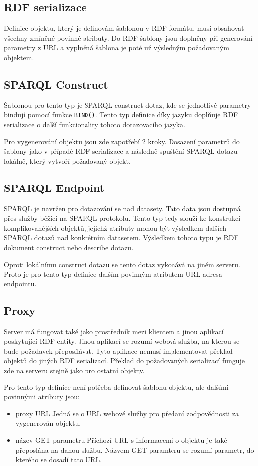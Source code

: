 \documentclass[thesis=B,czech]{FITthesis}[2012/06/26]
\begin{document}
 \subsection{RDF serializace}
   Definice objektu, který je definovám šablonou v RDF formátu, musí obsahovat všechny zmíněné povinné atributy. Do RDF šablony jsou doplněny při generování parametry z
   URL a vyplněná šablona je poté už výsledným požadovaným objektem.
 
 \subsection{SPARQL Construct}\label{sparql_construct}
  Šablonou pro tento typ je SPARQL construct dotaz, kde se jednotlivé parametry bindují pomocí funkce \texttt{BIND()}. Tento typ definice díky jazyku 
  doplňuje RDF serializace o další funkcionality tohoto dotazovacího jazyka.
  
  Pro vygenerování objektu jsou zde zapotřebí 2 kroky. Dosazení parametrů do šablony jako v případě RDF serializace a následně spuštění SPARQL dotazu lokálně, který
  vytvoří požadovaný objekt.
  
 \subsection{SPARQL Endpoint}
  SPARQL je navržen pro dotazování se nad datasety. Tato data jsou dostupná přes služby běžící na SPARQL protokolu. Tento typ tedy slouží ke konstrukci
  komplikovanějších objektů, jejichž atributy mohou být výsledkem dalších \\SPARQL dotazů nad konkrétním datasetem. Výsledkem tohoto typu je RDF dokument construct
  nebo describe dotazu.
  
  Oproti lokálnímu construct dotazu se tento dotaz vykonává na jiném serveru. Proto je pro tento typ definice dalším povinným atributem URL adresa endpointu.
  
 \subsection{Proxy}
  Server má fungovat také jako prostředník mezi klientem a jinou aplikací poskytující RDF entity. Jinou aplikací se rozumí webová služba, na kterou se bude požadavek
  přeposílávat. Tyto aplikace nemusí implementovat překlad objektů do jiných RDF serializací. Překlad do požadovaných serializací funguje zde na serveru stejně jako
  pro ostatní objekty.
  
  Pro tento typ definice není potřeba definovat šablonu objektu, ale dalšími povinnými atributy jsou:
  \begin{itemize}
  \item proxy URL
    \subitem Jedná se o URL webové služby pro předaní zodpovědnosti za vygenerován objektu.
    
  \item název GET parametru
    \subitem Příchozí URL s informacemi o objektu je také přeposlána na danou službu. Názvem GET paramteru se rozumí parametr, do kterého se dosadí tato URL.
 \end{itemize}
 
\end{document}
